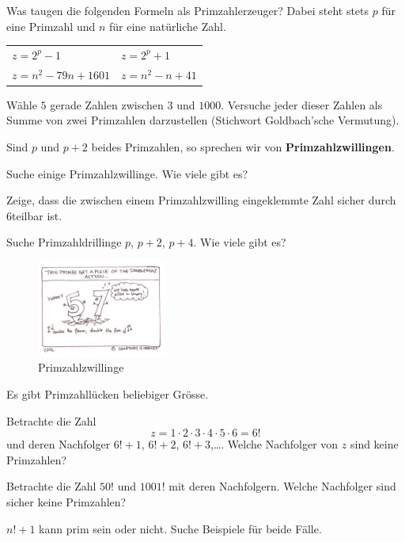 \documentclass[%
11pt,%
twoside,%
titlepage,%
german,%
headsepline%
]{scrartcl}
\begin{document}
\begin{ueb}[Primzahlformeln]
Was taugen die folgenden Formeln als Primzahlerzeuger? Dabei steht stets $p$ für eine Primzahl und $n$ für eine natürliche Zahl.

\begin{center}
    \begin{tabular}{ll}
        $z=2^p-1$ & $z=2^p+1$\\
        $z=n^2-79n+1601$ & $z=n^2-n+41$
    \end{tabular}
\end{center}
\end{ueb}

\begin{ueb}[Goldbach]
Wähle $5$ gerade Zahlen zwischen $3$ und $1000$. Versuche jeder dieser Zahlen als Summe von zwei Primzahlen darzustellen (Stichwort Goldbach'sche Vermutung).
\end{ueb}

\begin{ueb}
Sind $p$ und $p+2$ beides Primzahlen, so sprechen wir von \textbf{Primzahlzwillingen}.
\begin{enumeratea}
    \item Suche einige Primzahlzwillinge. Wie viele gibt es?
    \item Zeige, dass die zwischen einem Primzahlzwilling \glqq eingeklemmte\grqq{} Zahl sicher durch $6$teilbar ist.
    \item Suche Primzahldrillinge $p$, $p+2$, $p+4$. Wie viele gibt es?
\end{enumeratea}
\end{ueb}

\begin{figure}
    \begin{center}
        \includegraphics[width=0.382\textwidth]{pictures/primzahlzwillinge}
        \caption{Primzahlzwillinge}
    \end{center}
\end{figure}

\begin{ueb}[Primzahllücken]
Es gibt Primzahllücken beliebiger Grösse.
\begin{enumeratea}
    \item Betrachte die Zahl
    $$z=1\cdot2\cdot3\cdot4\cdot5\cdot6=6!$$
    und deren Nachfolger $6!+1$, $6!+2$, $6!+3$,\dots. Welche Nachfolger von $z$ sind keine Primzahlen?
    \item Betrachte die Zahl $50!$ und $1001!$ mit deren Nachfolgern. Welche Nachfolger sind sicher keine Primzahlen?
    \item $n!+1$ kann prim sein oder nicht. Suche Beispiele für beide Fälle.
\end{enumeratea}
\end{ueb}
\end{document}
